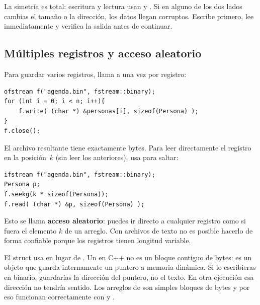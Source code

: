 \documentclass[12pt, oneside]{article}
\begin{document}
\begin{consejo}
  La simetría es total: escritura y lectura usan  y
  .  Si en alguno de los dos lados cambias el
  tamaño o la dirección, los datos llegan corruptos.  Escribe primero,
  lee inmediatamente y verifica la salida antes de continuar.
\end{consejo}

\subsection{Múltiples registros y acceso aleatorio}

Para guardar varios registros, llama a  una vez por registro:

\begin{verbatim}
ofstream f("agenda.bin", fstream::binary);
for (int i = 0; i < n; i++){
    f.write( (char *) &personas[i], sizeof(Persona) );
}
f.close();
\end{verbatim}

El archivo resultante tiene exactamente  bytes.
Para leer directamente el registro en la posición~$k$ (sin leer los
anteriores), usa  para saltar:

\begin{verbatim}
ifstream f("agenda.bin", fstream::binary);
Persona p;
f.seekg(k * sizeof(Persona));
f.read( (char *) &p, sizeof(Persona) );
\end{verbatim}

Esto se llama \textbf{acceso aleatorio}: puedes ir directo a cualquier
registro como si fuera el elemento $k$ de un arreglo.  Con archivos de
texto no es posible hacerlo de forma confiable porque los registros tienen
longitud variable.

\begin{tecnico}
  El struct  usa  en lugar de
  .  Un  en C++ no es un bloque contiguo de
  bytes: es un objeto que guarda internamente un puntero a memoria
  dinámica.  Si lo escribieras en binario, guardarías la dirección
  del puntero, no el texto.  En otra ejecución esa dirección no
  tendría sentido.  Los arreglos de  son simples bloques
  de bytes y por eso funcionan correctamente con  y
  .
\end{tecnico}

\end{document}

